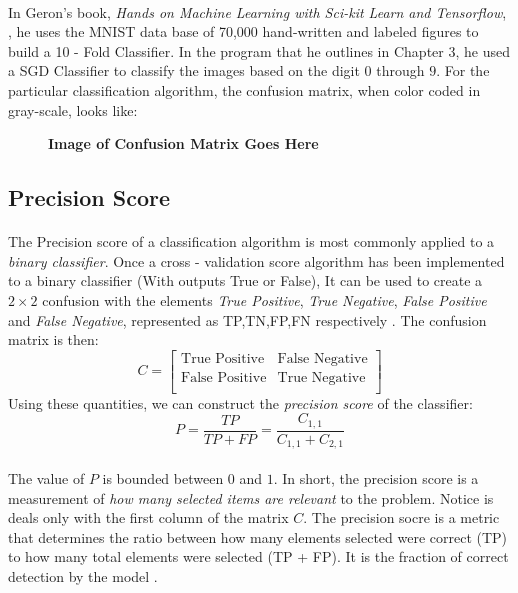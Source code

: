 \documentclass[12pt,letterpaper]{article}
\begin{document}
\paragraph*{}In Geron's book, \textit{Hands on Machine Learning with Sci-kit Learn and Tensorflow}, \cite{Geron}, he uses the MNIST data base of 70,000 hand-written and labeled figures to build a 10 - Fold Classifier. In the program that he outlines in Chapter 3, he used a SGD Classifier to classify the images based on the digit $0$ through $9$. For the particular classification algorithm, the confusion matrix, when color coded in gray-scale, looks like:
\begin{figure}[H]
\begin{center}
\textbf{Image of Confusion Matrix Goes Here}
\end{center}
\end{figure}



\subsection{Precision Score}
\paragraph*{}The Precision score of a classification algorithm is most commonly applied to a \textit{binary classifier}. Once a cross - validation score algorithm has been implemented to a binary classifier (With outputs \textsf{True} or \textsf{False}), It can be used to create a $2 \times 2$ confusion with the elements \textit{True Positive}, \textit{True Negative}, \textit{False Positive} and \textit{False Negative}, represented as TP,TN,FP,FN respectively \cite{Gareth}. The confusion matrix is then:
\begin{equation}
C = 
\begin{bmatrix}
\text{True Positive} & \text{False Negative} \\
\text{False Positive} & \text{True Negative} \\
\end{bmatrix}
\end{equation}
Using these quantities, we can construct the \textit{precision score} of the classifier:
\begin{equation}
\label{precsision score}
P = \frac{TP}{TP + FP} = \frac{C_{1,1}}{C_{1,1}+C_{2,1}}
\end{equation}
\paragraph*{}The value of $P$ is bounded between $0$ and $1$. In short, the precision score is a measurement of \textit{how many selected items are relevant} to the problem. Notice is deals only with the first column of the matrix $C$. The precision socre is a metric that determines the ratio between how many elements selected were correct (TP) to how many total elements were selected (TP + FP). It is the fraction of correct detection by the model \cite{Goodfellow}. 
\end{document}
